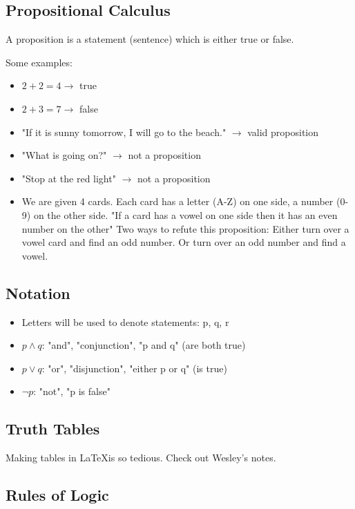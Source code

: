 \documentclass[9pt, letterpaper, oneside]{article}
\begin{document}
\subsection{Propositional Calculus}

A proposition is a statement (sentence) which is either true or false.

Some examples:
\begin{itemize}
	\item $2 + 2 = 4 \to$ true
	\item $2+3 = 7 \to$ false
	\item "If it is sunny tomorrow, I will go to the beach." $\to$ valid proposition
	\item "What is going on?" $\to$ not a proposition
	\item "Stop at the red light" $\to$ not a proposition
	\item We are given 4 cards. Each card has a letter (A-Z) on one side, a number (0-9) on the other side. "If a card has a vowel on one side then it has an even number on the other" Two ways to refute this proposition: Either turn over a vowel card and find an odd number. Or turn over an odd number and find a vowel.
\end{itemize}

\subsection{Notation}
\begin{itemize}
	\item Letters will be used to denote statements: p, q, r
	\item $p \wedge q$: "and", "conjunction", "p and q" (are both true)
	\item $p \vee q$: "or", "disjunction", "either p or q" (is true)
	\item $\neg p$: "not", "p is false"	
\end{itemize}

\subsection{Truth Tables}

Making tables in \LaTeX \quad is so tedious. Check out Wesley's notes.

\subsection{Rules of Logic}
\end{document}
